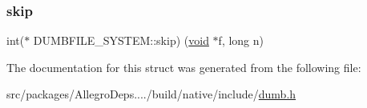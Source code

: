 \mbox{\label{struct_d_u_m_b_f_i_l_e___s_y_s_t_e_m_a36e814a2c9926357d457dc96b28d9f15}} 
\subsubsection{\texorpdfstring{skip}{skip}}
{\footnotesize\ttfamily int($\ast$ D\+U\+M\+B\+F\+I\+L\+E\+\_\+\+S\+Y\+S\+T\+E\+M\+::skip) (\hyperlink{png_8h_ac9c84fa68bbad002983e35ce3663c686}{void} $\ast$f, long n)}



The documentation for this struct was generated from the following file\+:\begin{DoxyCompactItemize}
\item 
src/packages/\+Allegro\+Deps..../build/native/include/\hyperlink{dumb_8h}{dumb.\+h}\end{DoxyCompactItemize}
